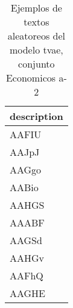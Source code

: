 \begin{table}[H]
\centering
\fontsize{8}{14}\selectfont
\caption{Ejemplos de textos aleatoreos del modelo tvae, conjunto Economicos a-2}
\label{table-sample10-economicos-a-2-tvae-text}
\begin{tabular}{|m{50em}|}
\hline
\rowcolor[gray]{0.8}
description \\
\hline AAFIU \\
\hline AAJpJ \\
\hline AAGgo \\
\hline AABio \\
\hline AAHGS \\
\hline AAABF \\
\hline AAGSd \\
\hline AAHGv \\
\hline AAFhQ \\
\hline AAGHE \\
\hline
\end{tabular}
\end{table}
